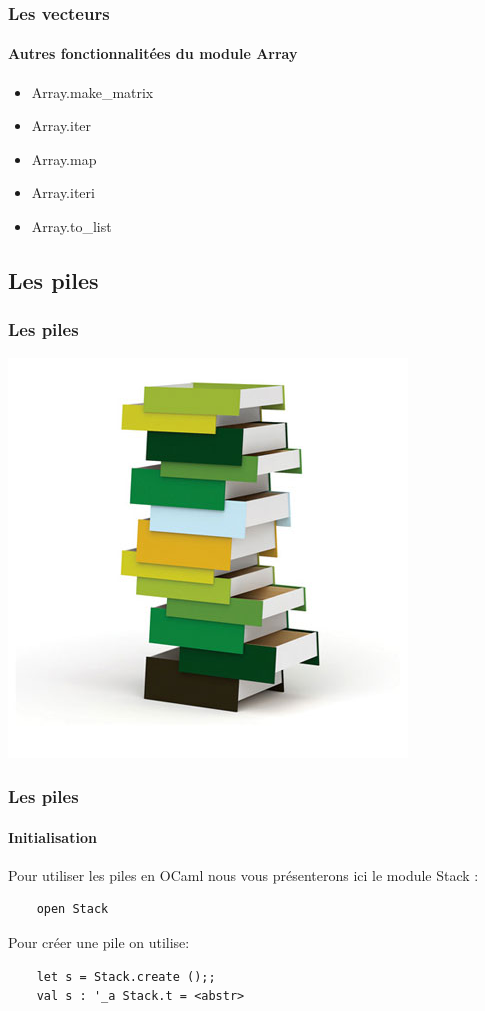 \begin{frame}[fragile]
	\frametitle{Les vecteurs}
	\framesubtitle{Autres fonctionnalitées du module Array}
	\begin{itemize}
	\item Array.make\_matrix
	
	\item Array.iter

	\item Array.map 

	\item Array.iteri

	\item Array.to\_list

	\end{itemize}
\end{frame}

\subsection{Les piles}
\begin{frame}
	\frametitle{Les piles}
	\includegraphics[scale=0.4]{pics/stack.jpg}
\end{frame}

\begin{frame}[fragile]
	\frametitle{Les piles}
	\framesubtitle{Initialisation}
	Pour utiliser les piles en OCaml nous vous présenterons ici le module Stack :
	\begin{lstlisting}
	open Stack
	\end{lstlisting}
	Pour créer une pile on utilise:
	\begin{lstlisting}
	let s = Stack.create ();;
	val s : '_a Stack.t = <abstr>
	\end{lstlisting}
\end{frame}


